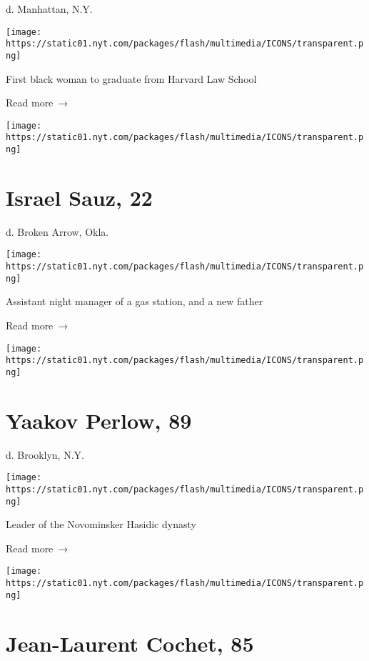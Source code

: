 d. Manhattan, N.Y.

\texttt{[image: https://static01.nyt.com/packages/flash/multimedia/ICONS/transparent.png]}

First black woman to graduate from Harvard Law School

 Read more~→

\href{https://www.nytimes.com/2020/04/13/obituaries/israel-sauz-dead-coronavirus.html}{}

\texttt{[image: https://static01.nyt.com/packages/flash/multimedia/ICONS/transparent.png]}

\hypertarget{israel-sauz-22}{%
\section{Israel Sauz, 22}\label{israel-sauz-22}}

d. Broken Arrow, Okla.

\texttt{[image: https://static01.nyt.com/packages/flash/multimedia/ICONS/transparent.png]}

Assistant night manager of a gas station, and a new father

 Read more~→

\href{https://www.nytimes.com/2020/04/10/obituaries/rabbi-yaakov-perlow-dead.html}{}

\texttt{[image: https://static01.nyt.com/packages/flash/multimedia/ICONS/transparent.png]}

\hypertarget{yaakov-perlow-89}{%
\section{Yaakov Perlow, 89}\label{yaakov-perlow-89}}

d. Brooklyn, N.Y.

\texttt{[image: https://static01.nyt.com/packages/flash/multimedia/ICONS/transparent.png]}

Leader of the Novominsker Hasidic dynasty

 Read more~→

\href{https://www.nytimes.com/2020/04/10/obituaries/jean-laurent-cochet-dead-coronavirus.html}{}

\texttt{[image: https://static01.nyt.com/packages/flash/multimedia/ICONS/transparent.png]}

\hypertarget{jean-laurent-cochet-85}{%
\section{Jean-Laurent Cochet, 85}\label{jean-laurent-cochet-85}}

